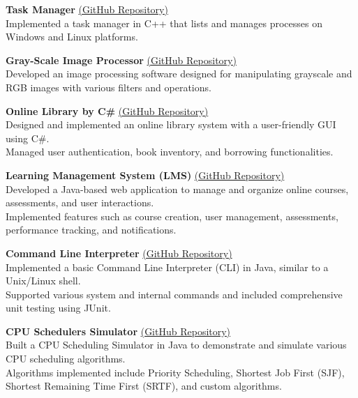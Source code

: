 \documentclass[a4paper,10pt]{article}
\begin{document}
\textbf{Task Manager} \href{https://github.com/YassenAli/Task-Manager-by-CPP}{(GitHub Repository)}  \\
\textbullet{}\hspace{2mm} Implemented a task manager in C++ that lists and manages processes on Windows and Linux platforms.

\textbf{Gray-Scale Image Processor} \href{https://github.com/YassenAli/Gray-Scale-Image-Processor-by-CPP}{(GitHub Repository)}  \\
\textbullet{}\hspace{2mm} Developed an image processing software designed for manipulating grayscale and RGB images with various filters and operations.

\textbf{Online Library by C\#} \href{https://github.com/YassenAli/Online-Library-by-C-sharp}{(GitHub Repository)}  \\
\textbullet{}\hspace{2mm} Designed and implemented an online library system with a user-friendly GUI using C\#.  \\
\textbullet{}\hspace{2mm} Managed user authentication, book inventory, and borrowing functionalities.

\textbf{Learning Management System (LMS)} \href{https://github.com/YassenAli/Learning-Management-System-LMS}{(GitHub Repository)}  \\
\textbullet{}\hspace{2mm} Developed a Java-based web application to manage and organize online courses, assessments, and user interactions.  \\
\textbullet{}\hspace{2mm} Implemented features such as course creation, user management, assessments, performance tracking, and notifications.

\textbf{Command Line Interpreter} \href{https://github.com/YassenAli/Command-Line-Interpreter}{(GitHub Repository)}  \\
\textbullet{}\hspace{2mm} Implemented a basic Command Line Interpreter (CLI) in Java, similar to a Unix/Linux shell.  \\
\textbullet{}\hspace{2mm} Supported various system and internal commands and included comprehensive unit testing using JUnit.

\textbf{CPU Schedulers Simulator} \href{https://github.com/YassenAli/CPU-Schedulers-Simulator}{(GitHub Repository)}  \\
\textbullet{}\hspace{2mm} Built a CPU Scheduling Simulator in Java to demonstrate and simulate various CPU scheduling algorithms.  \\
\textbullet{}\hspace{2mm} Algorithms implemented include Priority Scheduling, Shortest Job First (SJF), Shortest Remaining Time First (SRTF), and custom algorithms.
\end{document}

